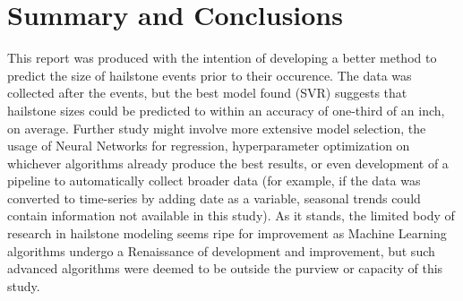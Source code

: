\documentclass[fleqn,10pt]{SelfArx} %
\begin{document}
\bigskip
\bigskip
\section{Summary and Conclusions}

This report was produced with the intention of developing a better method to predict the size of hailstone events prior to their occurence. The data was collected after the events, but the best model found (SVR) suggests that hailstone sizes could be predicted to within an accuracy of one-third of an inch, on average. Further study might involve more extensive model selection, the usage of Neural Networks for regression, hyperparameter optimization on whichever algorithms already produce the best results, or even development of a pipeline to automatically collect broader data (for example, if the data was converted to time-series by adding date as a variable, seasonal trends could contain information not available in this study). As it stands, the limited body of research in hailstone modeling seems ripe for improvement as Machine Learning algorithms undergo a Renaissance of development and improvement, but such advanced algorithms were deemed to be outside the purview or capacity of this study.

\bigskip
\bigskip
\bigskip



\end{document}
